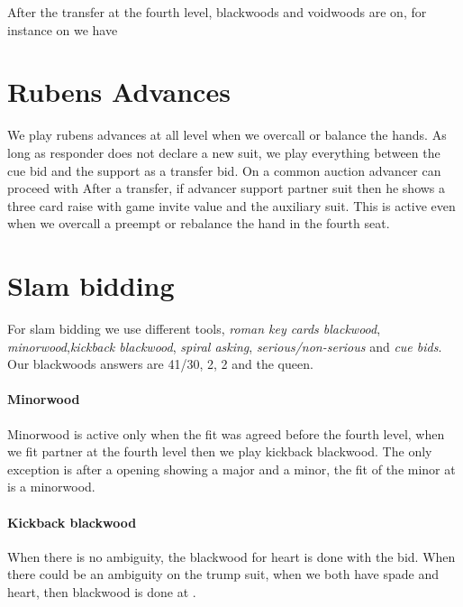 After the transfer at the fourth level, blackwoods and voidwoods are on, for instance on
we have
\section{Rubens Advances}
We play rubens advances at all level when we overcall or balance the hands. As long as responder does not declare a new suit, we play everything between the cue bid and the support as a transfer bid. On a common auction
advancer can proceed with 
After a transfer, if advancer support partner suit then he shows a three card raise with game invite value and the auxiliary suit. This is active even when we overcall a preempt or rebalance the hand in the fourth seat.
\section{Slam bidding}
For slam bidding we use different tools, \emph{roman key cards blackwood}, \emph{minorwood},\emph{kickback blackwood}, \emph{spiral asking}, \emph{serious/non-serious} and \emph{cue bids}. Our blackwoods answers are 41/30, 2, 2 and the queen.
\paragraph{Minorwood} Minorwood is active only when the fit was agreed before the fourth level, when we fit partner at the fourth level then we play kickback blackwood. The only exception is after a  opening showing a major and a minor, the fit of the minor at  is a minorwood.
\paragraph{Kickback blackwood} When there is no ambiguity, the blackwood for heart is done with the \bid{4\SpS} bid. When there could be an ambiguity on the trump suit, when we both have spade and heart, then blackwood is done at \bid{4\NT}.
